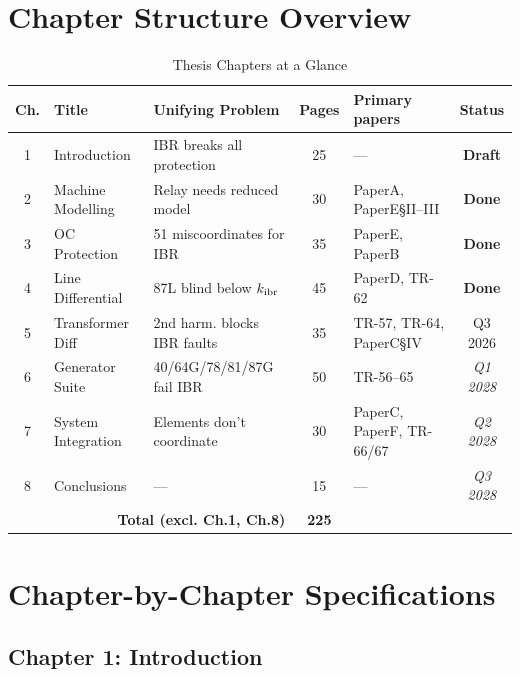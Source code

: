\documentclass[11pt, a4paper]{article}
\newcommand{\done}[1]{\textcolor{donecol}{\textbf{#1}}}
\newcommand{\wipp}[1]{\textcolor{wip}{#1}}
\newcommand{\plan}[1]{\textcolor{planned}{\textit{#1}}}
\begin{document}
\section{Chapter Structure Overview}
\label{sec:overview}

\begin{table}[!h]
\centering
\caption{Thesis Chapters at a Glance}
\label{tab:overview}
\begin{tabular}{clp{5.5cm}cp{2.8cm}c}
\toprule
Ch. & Title & Unifying Problem & Pages & Primary papers & Status \\
\midrule
1 & Introduction & IBR breaks all protection & 25 & --- & \done{Draft} \\
\rowcolor{C1col!8}
2 & Machine Modelling & Relay needs reduced model & 30 & PaperA, PaperE§II--III & \done{Done} \\
\rowcolor{C2col!8}
3 & OC Protection & 51 miscoordinates for IBR & 35 & PaperE, PaperB & \done{Done} \\
\rowcolor{C3col!8}
4 & Line Differential & 87L blind below $k_{\rm ibr}$ & 45 & PaperD, TR-62 & \done{Done} \\
\rowcolor{C4col!8}
5 & Transformer Diff & 2nd harm. blocks IBR faults & 35 & TR-57, TR-64, PaperC§IV & \wipp{Q3 2026} \\
\rowcolor{C5col!8}
6 & Generator Suite & 40/64G/78/81/87G fail IBR & 50 & TR-56--65 & \plan{Q1 2028} \\
\rowcolor{C6col!8}
7 & System Integration & Elements don't coordinate & 30 & PaperC, PaperF, TR-66/67 & \plan{Q2 2028} \\
8 & Conclusions & --- & 15 & --- & \plan{Q3 2028} \\
\midrule
\multicolumn{3}{r}{\textbf{Total (excl. Ch.1, Ch.8)}} & \textbf{225} & & \\
\bottomrule
\end{tabular}
\end{table}

\section{Chapter-by-Chapter Specifications}
\label{sec:chapters}

\subsection{Chapter 1: Introduction}
\end{document}
